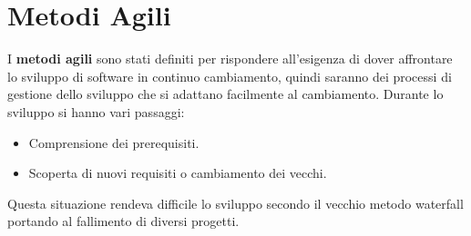 \chapter{Metodi Agili}
I \textbf{metodi agili} sono stati definiti per rispondere all'esigenza di dover
affrontare lo sviluppo di software in continuo cambiamento, quindi saranno dei
processi di gestione dello sviluppo che si adattano facilmente al cambiamento.
Durante lo sviluppo si hanno vari passaggi:
\begin{itemize}
      \item Comprensione dei prerequisiti.
      \item Scoperta di nuovi requisiti o cambiamento dei vecchi.
\end{itemize}
Questa situazione rendeva difficile lo sviluppo secondo il vecchio metodo
waterfall portando al fallimento di diversi progetti.


